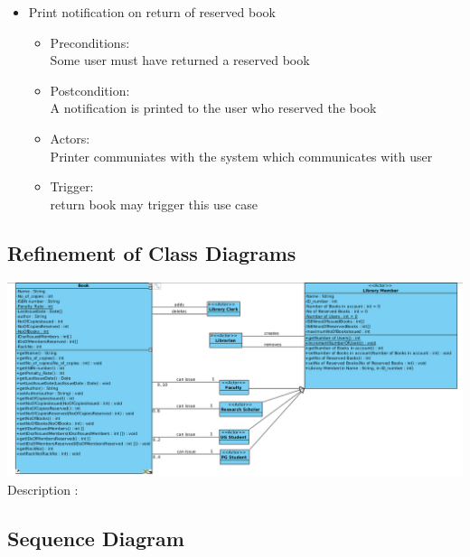 \documentclass[a4paper]{article}
\begin{document}
\begin{enumerate}
\begin{itemize}
\item Print notification on return of reserved book\\ 
\begin{itemize}
\item Preconditions:\\ Some user must have returned a reserved book \\ 
 \item Postcondition:\\ A notification is printed to the user who reserved the book\\ 
 \item Actors: \\ Printer communiates with the system which communicates with user\\ 
 \item Trigger:\\ return book may trigger this use case\\ 
\end{itemize}

\end{itemize}
\end{enumerate}
\subsection{Refinement of Class Diagrams}
\includegraphics[scale=0.35]{images/classDiag.png}
\\
Description : 
\subsection{Sequence Diagram}
\end{document}
